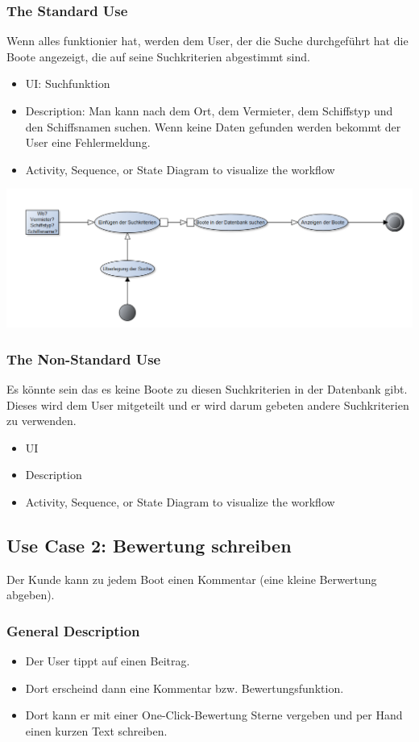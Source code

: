 \documentclass[12pt]{article}
\theoremstyle{definition}
\begin{document}
\subsubsection{The Standard Use}
Wenn alles funktionier hat, werden dem User, der die Suche durchgeführt hat die Boote angezeigt, die auf seine Suchkriterien abgestimmt sind.
\begin{itemize}
	\item UI: Suchfunktion
	\item Description: Man kann nach dem Ort, dem Vermieter, dem Schiffstyp und den Schiffsnamen suchen. Wenn keine Daten gefunden werden bekommt der User eine Fehlermeldung.
	\item Activity, Sequence, or State Diagram to visualize the workflow
\end{itemize}
\includegraphics[height=0.40\textwidth]{Aktivitaetsdiagramm.PNG}

\subsubsection{The Non-Standard Use}
Es könnte sein das es keine Boote zu diesen Suchkriterien in der Datenbank gibt. Dieses wird dem User mitgeteilt und er wird darum gebeten andere Suchkriterien zu verwenden.
\begin{itemize}
	\item UI
	\item Description
	\item Activity, Sequence, or State Diagram to visualize the workflow
\end{itemize}
\pagebreak

\subsection{Use Case 2: Bewertung schreiben}
Der Kunde kann zu jedem Boot einen Kommentar (eine kleine Berwertung abgeben).
\subsubsection{General Description}
	\begin{itemize}
		\item Der User tippt auf einen Beitrag.
		\item Dort erscheind dann eine Kommentar bzw. Bewertungsfunktion.
		\item Dort kann er mit einer One-Click-Bewertung Sterne vergeben und per Hand einen kurzen Text schreiben.
	\end{itemize}
\end{document}

